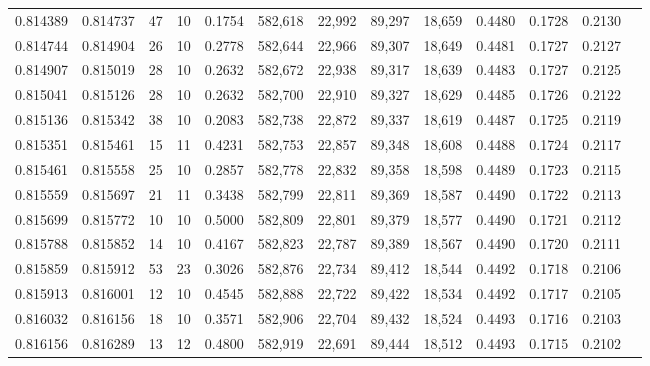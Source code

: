 \begin{tabular}{rrrrrrrrrrrrr}
0.814389 & 0.814737 &    47 &  10 &                                     0.1754 & 582,618 &  22,992 &  89,297 &  18,659 & 0.4480 & 0.1728 & 0.2130 \\
0.814744 & 0.814904 &    26 &  10 &                                     0.2778 & 582,644 &  22,966 &  89,307 &  18,649 & 0.4481 & 0.1727 & 0.2127 \\
0.814907 & 0.815019 &    28 &  10 &                                     0.2632 & 582,672 &  22,938 &  89,317 &  18,639 & 0.4483 & 0.1727 & 0.2125 \\
0.815041 & 0.815126 &    28 &  10 &                                     0.2632 & 582,700 &  22,910 &  89,327 &  18,629 & 0.4485 & 0.1726 & 0.2122 \\
0.815136 & 0.815342 &    38 &  10 &                                     0.2083 & 582,738 &  22,872 &  89,337 &  18,619 & 0.4487 & 0.1725 & 0.2119 \\
0.815351 & 0.815461 &    15 &  11 &                                     0.4231 & 582,753 &  22,857 &  89,348 &  18,608 & 0.4488 & 0.1724 & 0.2117 \\
0.815461 & 0.815558 &    25 &  10 &                                     0.2857 & 582,778 &  22,832 &  89,358 &  18,598 & 0.4489 & 0.1723 & 0.2115 \\
0.815559 & 0.815697 &    21 &  11 &                                     0.3438 & 582,799 &  22,811 &  89,369 &  18,587 & 0.4490 & 0.1722 & 0.2113 \\
0.815699 & 0.815772 &    10 &  10 &                                     0.5000 & 582,809 &  22,801 &  89,379 &  18,577 & 0.4490 & 0.1721 & 0.2112 \\
0.815788 & 0.815852 &    14 &  10 &                                     0.4167 & 582,823 &  22,787 &  89,389 &  18,567 & 0.4490 & 0.1720 & 0.2111 \\
0.815859 & 0.815912 &    53 &  23 &                                     0.3026 & 582,876 &  22,734 &  89,412 &  18,544 & 0.4492 & 0.1718 & 0.2106 \\
0.815913 & 0.816001 &    12 &  10 &                                     0.4545 & 582,888 &  22,722 &  89,422 &  18,534 & 0.4492 & 0.1717 & 0.2105 \\
0.816032 & 0.816156 &    18 &  10 &                                     0.3571 & 582,906 &  22,704 &  89,432 &  18,524 & 0.4493 & 0.1716 & 0.2103 \\
0.816156 & 0.816289 &    13 &  12 &                                     0.4800 & 582,919 &  22,691 &  89,444 &  18,512 & 0.4493 & 0.1715 & 0.2102 \\

\end{tabular}
